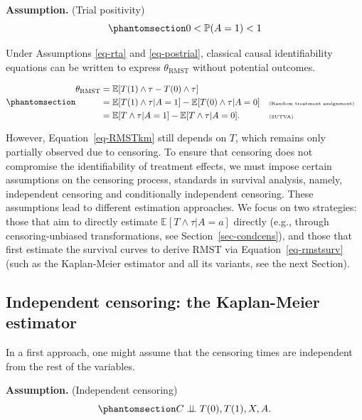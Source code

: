 \documentclass[
  11pt,
  a4paper,
]{article}
\theoremstyle{plain}
\theoremstyle{plain}
\theoremstyle{plain}
\theoremstyle{definition}
\theoremstyle{remark}
\begin{document}
\textbf{Assumption.} (Trial positivity)
\begin{equation}\phantomsection\label{eq-postrial}{ 
0 < \mathbb{P}(A=1) < 1
}\end{equation}

Under Assumptions \ref{eq-rta} and \ref{eq-postrial}, classical causal
identifiability equations can be written to express
\(\theta_{\mathrm{RMST}}\) without potential outcomes.

\begin{equation}\phantomsection\label{eq-RMSTkm}{
\begin{aligned}
    \theta_{\mathrm{RMST}} &=  \mathbb{E}[T(1) \wedge \tau - T(0) \wedge \tau]\\
    &= \mathbb{E}[T(1) \wedge \tau | A = 1] - \mathbb{E}[ T(0) \wedge \tau| A= 0]  && \tiny\text{(Random treatment assignment)} \\
       &= \mathbb{E}[T \wedge \tau | A = 1] - \mathbb{E}[ T \wedge \tau| A= 0].  && \tiny\text{(SUTVA)}
\end{aligned}
}\end{equation}

However, Equation~\ref{eq-RMSTkm} still depends on \(T\), which remains
only partially observed due to censoring. To ensure that censoring does
not compromise the identifiability of treatment effects, we must impose
certain assumptions on the censoring process, standards in survival
analysis, namely, independent censoring and conditionally independent
censoring. These assumptions lead to different estimation approaches. We
focus on two strategies: those that aim to directly estimate
\(\mathbb{E}[T \wedge \tau | A = a]\) directly (e.g., through
censoring-unbiased transformations, see Section~\ref{sec-condcens}), and
those that first estimate the survival curves to derive RMST via
Equation~\ref{eq-rmstsurv} (such as the Kaplan-Meier estimator and all
its variants, see the next Section).

\subsection{Independent censoring: the Kaplan-Meier
estimator}\label{sec-theoryRCT_indc}

In a first approach, one might assume that the censoring times are
independent from the rest of the variables.

\textbf{Assumption.} (Independent censoring)
\begin{equation}\phantomsection\label{eq-independantcensoring}{ 
C \perp\mkern-9.5mu\perp T(0),T(1),X,A.
}\end{equation}
\end{document}
